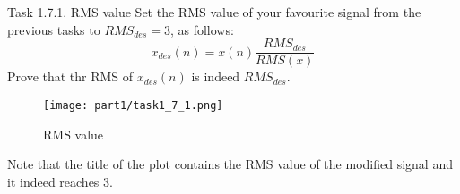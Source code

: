 \begin{Task}{Task 1.7.1. RMS value}
    Set the RMS value of your favourite signal from the previous tasks to $RMS_{des} = 3$, as follows:
    \begin{equation*}
        x_{des}(n) = x(n)\frac{RMS_{des}}{RMS(x)}
    \end{equation*}
    Prove that thr RMS of $x_{des}(n)$ is indeed $RMS_{des}$.
\end{Task}

\begin{figure}[H]
    \centering
    \texttt{[image: part1/task1\_7\_1.png]}
    \caption{RMS value}
\end{figure}

Note that the title of the plot contains the RMS value of the modified signal and it indeed reaches $3$.

